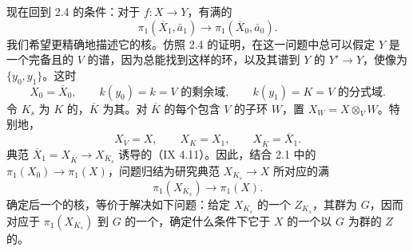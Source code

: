现在回到 2.4 的条件：对于 $f:X\to Y$，有满的
\[
\pi_1(\overline X_1,\bar a_1)\longrightarrow\pi_1(\overline X_0,\bar a_0).
\]
我们希望更精确地描述它的核。仿照 2.4 的证明，在这一问题中总可以假定 $Y$ 是一个完备且的 $V$ 的谱，因为总能找到这样的环，以及其谱到 $Y$ 的 $Y'\to Y$，使像为 $\{y_0,y_1\}$。这时
\[
X_0=\overline X_0,\qquad k(y_0)=k=V\text{ 的剩余域},
\qquad k(y_1)=K=V\text{ 的分式域}.
\]
令 $K_s$ 为 $K$ 的，$\overline K$ 为其。对 $\overline K$ 的每个包含 $V$ 的子环 $W$，置 $X_W=X\otimes_V W$。特别地，
\[
X_V=X,\qquad X_K=X_1,\qquad X_{\overline K}=\overline X_1.
\]
典范 $\overline X_1=X_{\overline K}\to X_{K_s}$ 诱导的（IX 4.11）。因此，结合 2.1 中的 $\pi_1(X_0)\to\pi_1(X)$，问题归结为研究典范 $X_{K_s}\to X$ 所对应的满
\[
\pi_1(X_{K_s})\longrightarrow\pi_1(X).
\]
确定后一个的核，等价于解决如下问题：给定 $X_{K_s}$ 的一个 $Z_{K_s}$，其群为 $G$，因而对应于 $\pi_1(X_{K_s})$ 到 $G$ 的一个，确定什么条件下它于 $X$ 的一个以 $G$ 为群的 $Z$ 的。


